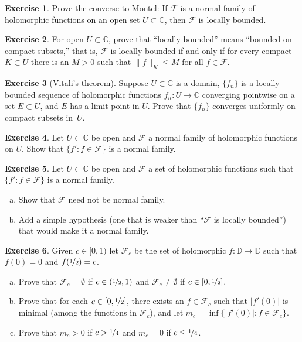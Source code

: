\documentclass[12pt,openany]{book}
\newcommand{\sabs}[1]{\lvert {#1} \rvert}
\newcommand{\snorm}[1]{\lVert {#1} \rVert}
\newcommand{\C}{{\mathbb{C}}}
\newcommand{\D}{{\mathbb{D}}}
\newcommand{\sF}{{\mathscr{F}}}
\newcommand{\myquote}[1]{``#1''}
\theoremstyle{plain}
\theoremstyle{remark}
\theoremstyle{definition}
\newenvironment{exbox}{%
    \def\FrameCommand{\vrule width 1pt \relax\hspace{10pt}}%
    \MakeFramed{\advance\hsize-\width\FrameRestore}%
}{%
    \endMakeFramed
}
\newenvironment{exparts}{%
    \leavevmode\begin{enumerate}[a),noitemsep,topsep=0pt,parsep=0pt,partopsep=0pt]
}{%
    \end{enumerate}
}
\theoremstyle{exercise}
\newtheorem{exercise}{Exercise}[section]
\theoremstyle{example}
\begin{document}
\begin{exbox}
\begin{exercise}
Prove the converse to Montel:
If $\sF$ is a normal family of holomorphic functions on an open set $U \subset \C$,
then $\sF$ is locally bounded.
\end{exercise}

\begin{exercise}
For open $U \subset \C$,
prove that \myquote{locally bounded} means
\myquote{bounded on compact subsets,}
that is, $\sF$ is locally bounded if and only if
for every compact $K \subset U$ there is an $M >0$ such that
$\snorm{f}_K \leq M$ for all $f \in \sF$.
\end{exercise}

\begin{exercise}[Vitali's theorem]
Suppose $U \subset \C$ is a domain, $\{ f_n \}$ is a locally bounded
sequence of holomorphic functions $f_n \colon U \to \C$
converging pointwise on a set $E \subset U$,
and $E$ has a limit point in $U$.  Prove that $\{ f_n \}$
converges uniformly on compact subsets in~$U$.
\end{exercise}

\begin{exercise}
Let $U \subset \C$ be open and $\sF$ a normal family of
holomorphic functions on $U$.
Show that $\{ f' : f \in \sF \}$ is a normal family.
\end{exercise}

\begin{exercise}
Let $U \subset \C$ be open and $\sF$ a set of holomorphic
functions such that $\{ f' : f \in \sF \}$ is a normal family.
\begin{exparts}
\item
Show that $\sF$ need not be normal family.
\item
Add a simple
hypothesis (one that is weaker than \myquote{$\sF$ is locally bounded})
that would make it a normal family.
\end{exparts}
\end{exercise}

\begin{exercise}
Given $c \in [0,1)$ let $\sF_c$ be the set of holomorphic
$f \colon \D \to \D$ such that $f(0) = 0$ and $f(\nicefrac{1}{2}) = c$.
\begin{exparts}
\item
Prove that
$\sF_c = \emptyset$ if $c \in (\nicefrac{1}{2},1)$
and
$\sF_c \not= \emptyset$ if $c \in [0,\nicefrac{1}{2}]$.
\item
Prove that for each $c \in [0,\nicefrac{1}{2}]$, there exists an
$f \in \sF_c$
such that $\sabs{f'(0)}$ is minimal (among the functions in $\sF_c$),
and let $m_c = \inf \bigl\{ \sabs{f'(0)} : f \in \sF_c \bigr\}$.
\item
Prove that $m_c > 0$ if $c > \nicefrac{1}{4}$ and $m_c = 0$ if $c \leq \nicefrac{1}{4}$.
\end{exparts}
\end{exercise}


\end{exbox}
\end{document}
